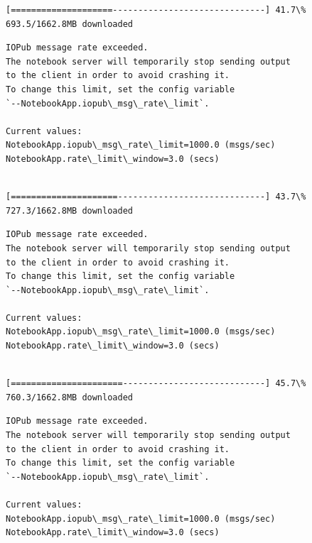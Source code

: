 \documentclass[11pt]{article}
\begin{document}
    \begin{Verbatim}[commandchars=\\\{\}]
[====================------------------------------] 41.7\% 693.5/1662.8MB downloaded
    \end{Verbatim}

    \begin{Verbatim}[commandchars=\\\{\}]
IOPub message rate exceeded.
The notebook server will temporarily stop sending output
to the client in order to avoid crashing it.
To change this limit, set the config variable
`--NotebookApp.iopub\_msg\_rate\_limit`.

Current values:
NotebookApp.iopub\_msg\_rate\_limit=1000.0 (msgs/sec)
NotebookApp.rate\_limit\_window=3.0 (secs)


    \end{Verbatim}

    \begin{Verbatim}[commandchars=\\\{\}]
[=====================-----------------------------] 43.7\% 727.3/1662.8MB downloaded
    \end{Verbatim}

    \begin{Verbatim}[commandchars=\\\{\}]
IOPub message rate exceeded.
The notebook server will temporarily stop sending output
to the client in order to avoid crashing it.
To change this limit, set the config variable
`--NotebookApp.iopub\_msg\_rate\_limit`.

Current values:
NotebookApp.iopub\_msg\_rate\_limit=1000.0 (msgs/sec)
NotebookApp.rate\_limit\_window=3.0 (secs)


    \end{Verbatim}

    \begin{Verbatim}[commandchars=\\\{\}]
[======================----------------------------] 45.7\% 760.3/1662.8MB downloaded
    \end{Verbatim}

    \begin{Verbatim}[commandchars=\\\{\}]
IOPub message rate exceeded.
The notebook server will temporarily stop sending output
to the client in order to avoid crashing it.
To change this limit, set the config variable
`--NotebookApp.iopub\_msg\_rate\_limit`.

Current values:
NotebookApp.iopub\_msg\_rate\_limit=1000.0 (msgs/sec)
NotebookApp.rate\_limit\_window=3.0 (secs)


    \end{Verbatim}
\end{document}
